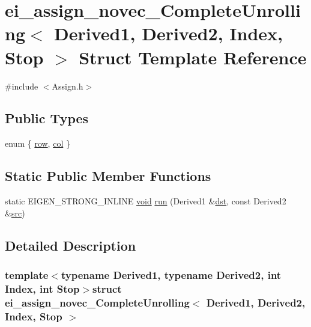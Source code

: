 \hypertarget{structei__assign__novec___complete_unrolling}{\section{ei\-\_\-assign\-\_\-novec\-\_\-\-Complete\-Unrolling$<$ Derived1, Derived2, Index, Stop $>$ Struct Template Reference}
\label{structei__assign__novec___complete_unrolling}
}


{\ttfamily \#include $<$Assign.\-h$>$}

\subsection*{Public Types}
\begin{DoxyCompactItemize}
\item 
enum \{ \hyperlink{structei__assign__novec___complete_unrolling_a1ad384b484571d58d73fc926693799b1ad4b7cd43f6a0986dd6d8c37f6ee48a3c}{row}, 
\hyperlink{structei__assign__novec___complete_unrolling_a1ad384b484571d58d73fc926693799b1ae2b482a137635b949ea26ce0b00985cc}{col}
 \}
\end{DoxyCompactItemize}
\subsection*{Static Public Member Functions}
\begin{DoxyCompactItemize}
\item 
static E\-I\-G\-E\-N\-\_\-\-S\-T\-R\-O\-N\-G\-\_\-\-I\-N\-L\-I\-N\-E \hyperlink{group___u_a_v_objects_plugin_ga444cf2ff3f0ecbe028adce838d373f5c}{void} \hyperlink{structei__assign__novec___complete_unrolling_aa842d6e4671919d6018bb560466a5966}{run} (Derived1 \&\hyperlink{glext_8h_a92034251bfd455d524a9b5610cddba00}{dst}, const Derived2 \&\hyperlink{glext_8h_a72e0fdf0f845ded60b1fada9e9195cd7}{src})
\end{DoxyCompactItemize}


\subsection{Detailed Description}
\subsubsection*{template$<$typename Derived1, typename Derived2, int Index, int Stop$>$struct ei\-\_\-assign\-\_\-novec\-\_\-\-Complete\-Unrolling$<$ Derived1, Derived2, Index, Stop $>$}



